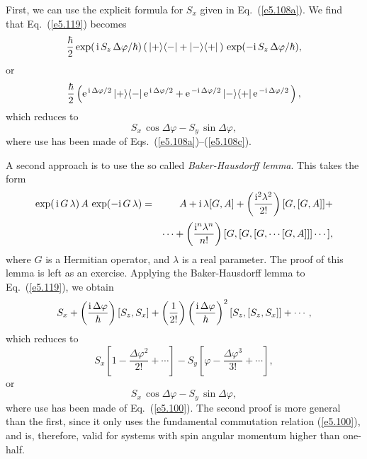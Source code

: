 First, we can use the explicit formula for $S_x$ given in Eq.~(\ref{e5.108a}). We find
that Eq.~(\ref{e5.119}) becomes
\begin{equation}
\frac{\hbar}{2} \exp(\,{\rm i}\,S_z\, \Delta\varphi/\hbar)\,
(\,|+\rangle \langle -| + |-\rangle \langle +|\,)\,
\exp(-{\rm i}\,S_z \,\Delta\varphi/\hbar),
\end{equation}
or 
\begin{equation}
\frac{\hbar}{2} 
\left( {\rm e}^{\,{\rm i}\,\Delta\varphi/2}\,|+\rangle \langle -|\,
{\rm e}^{\,{\rm i}\,\Delta\varphi/2} + {\rm e}^{\,-{\rm i}\,\Delta\varphi/2}
\,|-\rangle \langle +|\,{\rm e}^{\,-{\rm i}\,\Delta\varphi/2}\,\right),
\end{equation}
which reduces to
\begin{equation}
S_x\,\cos\Delta\varphi - S_y\,\sin\Delta\varphi,
\end{equation}
where use has been made of Eqs.~(\ref{e5.108a})--(\ref{e5.108c}).

A second approach is to use the so called {\em Baker-Hausdorff lemma}. This
takes the form
\begin{eqnarray}
\exp(\,{\rm i}\, G\,\lambda)\,A\, \exp(-{\rm i} \,G \,\lambda)&=& A + {\rm i} \,\lambda
[G,A] + \left(\frac{{\rm i}^2 \lambda^2}{2!}\right) [G, [G,A]]+\\[0.5ex]
&&\cdots +   
\left(\frac{{\rm i}^n\lambda^n}{n!}\right)[G, [G, [G, \cdots [G,A]]]\cdots]
\nonumber,\label{e5.123}
\end{eqnarray}
where $G$ is a Hermitian operator, and $\lambda$ is a real parameter. The proof
of this lemma is left as an exercise. Applying the Baker-Hausdorff lemma
to Eq.~(\ref{e5.119}), we obtain 
\begin{equation}
S_x + \left(\frac{{\rm i}\,\Delta\varphi}{\hbar}\right) [S_z, S_x]
+ \left(\frac{1}{2!}\right) \left(\frac{{\rm i}\,\Delta\varphi}{\hbar}\right)^2
[S_z, [S_z, S_x]] + \cdots,
\end{equation}
which reduces to 
\begin{equation}
S_x\left[ 1- \frac{\Delta\varphi^2}{2!} + \cdots\right] - S_y \left[\varphi - 
\frac{\Delta\varphi^3}{3!} +\cdots\right],
\end{equation}
or
\begin{equation}
S_x\,\cos\Delta\varphi - S_y\,\sin\Delta\varphi,
\end{equation}
where  use has been made of Eq.~(\ref{e5.100}). The second
proof is more general than the first, since it only uses the fundamental
 commutation relation (\ref{e5.100}), and is, therefore, valid for systems with spin
angular momentum higher than one-half.

